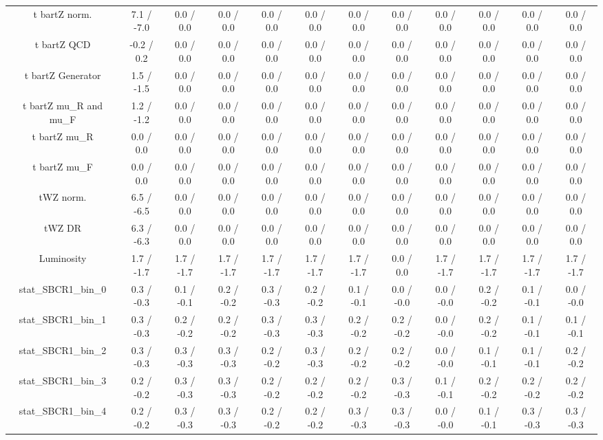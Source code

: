 \begin{table}[htbp]
\begin{center}
\begin{tabular}{|c|c|c|c|c|c|c|c|c|c|c|c|}
  t bar{t}Z norm. & 7.1 / -7.0 & 0.0 / 0.0 & 0.0 / 0.0 & 0.0 / 0.0 & 0.0 / 0.0 & 0.0 / 0.0 & 0.0 / 0.0 & 0.0 / 0.0 & 0.0 / 0.0 & 0.0 / 0.0 & 0.0 / 0.0 \\ 
  t bar{t}Z QCD & -0.2 / 0.2 & 0.0 / 0.0 & 0.0 / 0.0 & 0.0 / 0.0 & 0.0 / 0.0 & 0.0 / 0.0 & 0.0 / 0.0 & 0.0 / 0.0 & 0.0 / 0.0 & 0.0 / 0.0 & 0.0 / 0.0 \\ 
  t bar{t}Z Generator & 1.5 / -1.5 & 0.0 / 0.0 & 0.0 / 0.0 & 0.0 / 0.0 & 0.0 / 0.0 & 0.0 / 0.0 & 0.0 / 0.0 & 0.0 / 0.0 & 0.0 / 0.0 & 0.0 / 0.0 & 0.0 / 0.0 \\ 
  t bar{t}Z  mu_{R} and  mu_{F} & 1.2 / -1.2 & 0.0 / 0.0 & 0.0 / 0.0 & 0.0 / 0.0 & 0.0 / 0.0 & 0.0 / 0.0 & 0.0 / 0.0 & 0.0 / 0.0 & 0.0 / 0.0 & 0.0 / 0.0 & 0.0 / 0.0 \\ 
  t bar{t}Z  mu_{R} & 0.0 / 0.0 & 0.0 / 0.0 & 0.0 / 0.0 & 0.0 / 0.0 & 0.0 / 0.0 & 0.0 / 0.0 & 0.0 / 0.0 & 0.0 / 0.0 & 0.0 / 0.0 & 0.0 / 0.0 & 0.0 / 0.0 \\ 
  t bar{t}Z  mu_{F} & 0.0 / 0.0 & 0.0 / 0.0 & 0.0 / 0.0 & 0.0 / 0.0 & 0.0 / 0.0 & 0.0 / 0.0 & 0.0 / 0.0 & 0.0 / 0.0 & 0.0 / 0.0 & 0.0 / 0.0 & 0.0 / 0.0 \\ 
  tWZ norm. & 6.5 / -6.5 & 0.0 / 0.0 & 0.0 / 0.0 & 0.0 / 0.0 & 0.0 / 0.0 & 0.0 / 0.0 & 0.0 / 0.0 & 0.0 / 0.0 & 0.0 / 0.0 & 0.0 / 0.0 & 0.0 / 0.0 \\ 
  tWZ DR & 6.3 / -6.3 & 0.0 / 0.0 & 0.0 / 0.0 & 0.0 / 0.0 & 0.0 / 0.0 & 0.0 / 0.0 & 0.0 / 0.0 & 0.0 / 0.0 & 0.0 / 0.0 & 0.0 / 0.0 & 0.0 / 0.0 \\ 
  Luminosity & 1.7 / -1.7 & 1.7 / -1.7 & 1.7 / -1.7 & 1.7 / -1.7 & 1.7 / -1.7 & 1.7 / -1.7 & 0.0 / 0.0 & 1.7 / -1.7 & 1.7 / -1.7 & 1.7 / -1.7 & 1.7 / -1.7 \\ 
 stat_SBCR1_bin_0 & 0.3 / -0.3 & 0.1 / -0.1 & 0.2 / -0.2 & 0.3 / -0.3 & 0.2 / -0.2 & 0.1 / -0.1 & 0.0 / -0.0 & 0.0 / -0.0 & 0.2 / -0.2 & 0.1 / -0.1 & 0.0 / -0.0 \\ 
 stat_SBCR1_bin_1 & 0.3 / -0.3 & 0.2 / -0.2 & 0.2 / -0.2 & 0.3 / -0.3 & 0.3 / -0.3 & 0.2 / -0.2 & 0.2 / -0.2 & 0.0 / -0.0 & 0.2 / -0.2 & 0.1 / -0.1 & 0.1 / -0.1 \\ 
 stat_SBCR1_bin_2 & 0.3 / -0.3 & 0.3 / -0.3 & 0.3 / -0.3 & 0.2 / -0.2 & 0.3 / -0.3 & 0.2 / -0.2 & 0.2 / -0.2 & 0.0 / -0.0 & 0.1 / -0.1 & 0.1 / -0.1 & 0.2 / -0.2 \\ 
 stat_SBCR1_bin_3 & 0.2 / -0.2 & 0.3 / -0.3 & 0.3 / -0.3 & 0.2 / -0.2 & 0.2 / -0.2 & 0.2 / -0.2 & 0.3 / -0.3 & 0.1 / -0.1 & 0.2 / -0.2 & 0.2 / -0.2 & 0.2 / -0.2 \\ 
 stat_SBCR1_bin_4 & 0.2 / -0.2 & 0.3 / -0.3 & 0.3 / -0.3 & 0.2 / -0.2 & 0.2 / -0.2 & 0.3 / -0.3 & 0.3 / -0.3 & 0.0 / -0.0 & 0.1 / -0.1 & 0.3 / -0.3 & 0.3 / -0.3 \\ 

\end{tabular}
\end{center}
\end{table}
